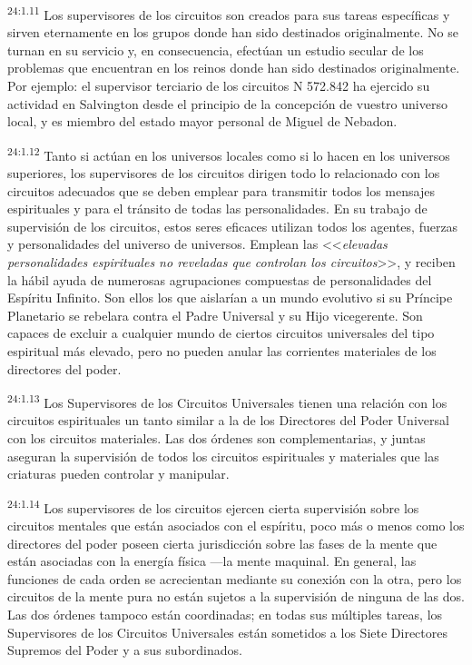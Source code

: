 \par
\textsuperscript{24:1.11} Los supervisores de los circuitos son creados para sus tareas específicas y sirven eternamente en los grupos donde han sido destinados originalmente. No se turnan en su servicio y, en consecuencia, efectúan un estudio secular de los problemas que encuentran en los reinos donde han sido destinados originalmente. Por ejemplo: el supervisor terciario de los circuitos N{\textdegree} 572.842 ha ejercido su actividad en Salvington desde el principio de la concepción de vuestro universo local, y es miembro del estado mayor personal de Miguel de Nebadon.

\par
\textsuperscript{24:1.12} Tanto si actúan en los universos locales como si lo hacen en los universos superiores, los supervisores de los circuitos dirigen todo lo relacionado con los circuitos adecuados que se deben emplear para transmitir todos los mensajes espirituales y para el tránsito de todas las personalidades. En su trabajo de supervisión de los circuitos, estos seres eficaces utilizan todos los agentes, fuerzas y personalidades del universo de universos. Emplean las <<\textit{elevadas personalidades espirituales no reveladas que controlan los circuitos}>>, y reciben la hábil ayuda de numerosas agrupaciones compuestas de personalidades del Espíritu Infinito. Son ellos los que aislarían a un mundo evolutivo si su Príncipe Planetario se rebelara contra el Padre Universal y su Hijo vicegerente. Son capaces de excluir a cualquier mundo de ciertos circuitos universales del tipo espiritual más elevado, pero no pueden anular las corrientes materiales de los directores del poder.

\par
\textsuperscript{24:1.13} Los Supervisores de los Circuitos Universales tienen una relación con los circuitos espirituales un tanto similar a la de los Directores del Poder Universal con los circuitos materiales. Las dos órdenes son complementarias, y juntas aseguran la supervisión de todos los circuitos espirituales y materiales que las criaturas pueden controlar y manipular.

\par
\textsuperscript{24:1.14} Los supervisores de los circuitos ejercen cierta supervisión sobre los circuitos mentales que están asociados con el espíritu, poco más o menos como los directores del poder poseen cierta jurisdicción sobre las fases de la mente que están asociadas con la energía física ---la mente maquinal. En general, las funciones de cada orden se acrecientan mediante su conexión con la otra, pero los circuitos de la mente pura no están sujetos a la supervisión de ninguna de las dos. Las dos órdenes tampoco están coordinadas; en todas sus múltiples tareas, los Supervisores de los Circuitos Universales están sometidos a los Siete Directores Supremos del Poder y a sus subordinados.

